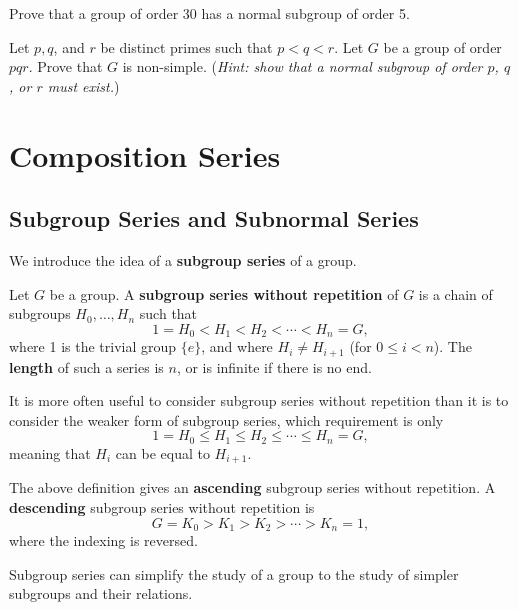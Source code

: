 \begin{problem}\label{problem-group-of-order-30-has-normal-subgroup-of-order-5}
    Prove that a group of order 30 has a normal subgroup of order 5.
\end{problem}

\begin{problem}\label{problem-group-of-order-pqr-is-non-simple}
    Let $p, q$, and $r$ be distinct primes such that $p < q < r$. Let $G$ be a group of order $pqr$. Prove that $G$ is non-simple.\newline
    (\textit{Hint: show that a normal subgroup of order $p$, $q$, or $r$ must exist.})
\end{problem}

\chapter{Composition Series}
\section{Subgroup Series and Subnormal Series}
We introduce the idea of a \textbf{subgroup series} of a group.
\begin{definition}
    Let $G$ be a group. A \textbf{subgroup series without repetition} of $G$ is a chain of subgroups $H_0, \dots, H_n$ such that
    \[
        1 = H_0 < H_1 < H_2 < \cdots < H_n = G,
    \]
    where 1 is the trivial group $\{e\}$, and where $H_i \neq H_{i+1}$ (for $0 \leq i < n$). The \textbf{length} of such a series is $n$, or is infinite if there is no end.
\end{definition}
\begin{remark}
    It is more often useful to consider subgroup series without repetition than it is to consider the weaker form of subgroup series, which requirement is only
    \[
        1 = H_0 \leq H_1 \leq H_2 \leq \cdots \leq H_n = G,
    \]
    meaning that $H_i$ can be equal to $H_{i+1}$.
\end{remark}
\begin{remark}
    The above definition gives an \textbf{ascending} subgroup series without repetition. A \textbf{descending} subgroup series without repetition is
    \[
        G = K_0 > K_1 > K_2 > \cdots > K_n = 1,
    \]
    where the indexing is reversed.
\end{remark}

Subgroup series can simplify the study of a group to the study of simpler subgroups and their relations.

